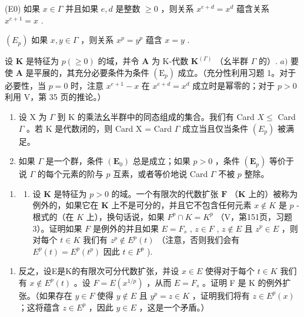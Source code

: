 (E0) 如果 \(x \in \Gamma\) 并且如果 \(e, d\) 是整数 \(\geqslant 0\) ，则关系 \(x^{e + d} = x^d\) 蕴含关系 \(x^{e + 1} = x\) .

\((E_p)\) 如果 \(x, y \in \Gamma\) ，则关系 \(x^p = y^p\) 蕴含 \(x = y\) .

设 \(\mathbf{K}\) 是特征为 \(p (\geqslant 0)\) 的域，并令 \(\mathbf{A}\) 为 K-代数 \(\mathbf{K}^{(\Gamma)}\) （幺半群 \(\Gamma\) 的）. \(a)\) 要使 \(\mathbf{A}\) 是平展的，其充分必要条件为条件 \((\mathrm{E}_p)\) 成立。（充分性利用习题 1。对于必要性，当 \(p = 0\) 时，注意 \(x^{e+1} - x\) 在 \(x^{e+d} = x^d\) 成立时是幂零的；对于 \(p > 0\) 利用 V，第 35 页的推论。）

\begin{enumerate}
\def\labelenumi{\alph{enumi})}
\setcounter{enumi}{1}
\item
  设 X 为 \(\Gamma\) 到 K 的乘法幺半群中的同态组成的集合。我们有 Card \(X \leqslant\) Card \(\Gamma\) 。若 K 是代数闭的，则 Card X = Card \(\Gamma\) 成立当且仅当条件 \((E_{p})\) 被满足。
\item
  如果 \(\Gamma\) 是一个群，条件 \((\mathbf{E}_0)\) 总是成立；如果 \(p > 0\) ，条件 \((\mathbf{E}_p)\) 等价于说 \(\Gamma\) 的每个元素的阶与 \(p\) 互素，或者等价地说 Card \(\Gamma\) 不被 \(p\) 整除。
\end{enumerate}

\BourbakiExerciseGroup

\begin{enumerate}
\def\labelenumi{\arabic{enumi})}
\tightlist
\item
  \begin{enumerate}
  \def\labelenumii{\alph{enumii})}
  \tightlist
  \item
    设 \(\mathbf{K}\) 是特征为 \(p > 0\) 的域。一个有限次的代数扩张 \(\mathbf{F}\) （\(\mathbf{K}\) 上的）被称为例外的，如果它在 \(\mathbf{K}\) 上不是可分的，并且它不包含任何元素 \(x \notin K\) 是 \(p\) -根式的（在 \(K\) 上），换句话说，如果 \(F^p \cap K = K^p\) （V，第151页，习题3）。证明如果 \(F\) 是例外的并且如果 \(E = F_s\) , \(z \in F\) , \(z \notin E\) 且 \(z^p \in E\) ，则对每个 \(t \in K\) 我们有 \(z^p \notin E^p(t)\) （注意，否则我们会有 \(E^p(t) = E^p(t^p)\) 因此 \(t \in F^p\) ).
  \end{enumerate}
\end{enumerate}

\begin{enumerate}
\def\labelenumi{\alph{enumi})}
\setcounter{enumi}{1}
\tightlist
\item
  反之，设E是K的有限次可分代数扩张，并设 \(x \in E\) 使得对于每个 \(t \in K\) 我们有 \(x \notin E^p(t)\) 。设 \(F = E(x^{1/p})\) ，从而 \(E = F_s\) 。证明 F 是 K 的例外扩张。（如果存在 \(y \in F\) 使得 \(y \notin E\) 且 \(y^p = z \in K\) ，证明我们将有 \(z \in E^p(x)\) ；这将蕴含 \(z \in E^p\) ，因此 \(y \in E\) ，这是一个矛盾。）
\end{enumerate}

